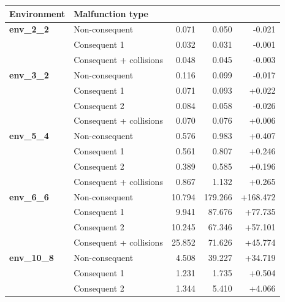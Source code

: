 \documentclass[runningheads]{llncs}
\begin{document}
\begin{table}[htbp]
	\centering
	\footnotesize
	\setlength{\tabcolsep}{4pt}
	\renewcommand{\arraystretch}{0.9}
	
	\begin{tabular}{@{}llrrr@{}}
		\toprule
		\textbf{Environment} &
		\textbf{Malfunction type} &
		\makecell[r]{\textbf{heuristic}} &
		\makecell[r]{\textbf{~~time priority}} &
		\makecell[r]{\textbf{$\Delta T_{\mathrm{res}}$}} \\
		\midrule

		\textbf{env\_2\_2}
		& Non-consequent & 0.071 & 0.050 & -0.021 \\
		& Consequent 1 & 0.032 & 0.031 & -0.001 \\
		& Consequent + collisions & 0.048 & 0.045 & -0.003 \\
		
		\midrule
		
		\textbf{env\_3\_2}
		& Non-consequent & 0.116 & 0.099 & -0.017 \\
		& Consequent 1 & 0.071 & 0.093 & +0.022 \\
		& Consequent 2 & 0.084 & 0.058 & -0.026 \\
		& Consequent + collisions & 0.070 & 0.076 & +0.006 \\
		
		\midrule
		
		\textbf{env\_5\_4}
		& Non-consequent & 0.576 & 0.983 & +0.407 \\
		& Consequent 1 & 0.561 & 0.807 & +0.246 \\
		& Consequent 2 & 0.389 & 0.585 & +0.196 \\
		& Consequent + collisions & 0.867 & 1.132 & +0.265 \\
		
		\midrule
		
		\textbf{env\_6\_6}
		& Non-consequent & 10.794 & 179.266 & +168.472 \\
		& Consequent 1 & 9.941 & 87.676 & +77.735 \\
		& Consequent 2 & 10.245 & 67.346 & +57.101 \\
		& Consequent + collisions & 25.852 & 71.626 & +45.774 \\
		
		\midrule
		
		\textbf{env\_10\_8}
		& Non-consequent & 4.508 & 39.227 & +34.719 \\
		& Consequent 1 & 1.231 & 1.735 & +0.504 \\
		& Consequent 2 & 1.344 & 5.410 & +4.066 \\
		

\end{tabular}
\end{table}
\end{document}
